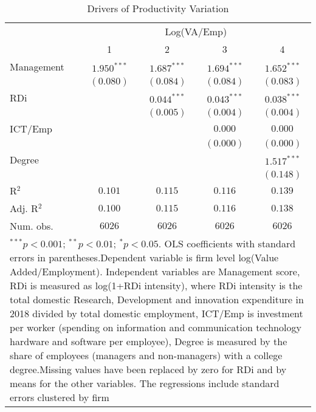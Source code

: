 \documentclass{article}
\begin{document}
\begin{table}
\caption{Drivers of Productivity Variation}
\begin{center}
\begin{normalsize}
\begin{tabular}{l c c c c}
\hline
 & \multicolumn{4}{c}{Log(VA/Emp)} \\
\cline{2-5}
 & 1 & 2 & 3 & 4 \\
\hline
Management & $1.950^{***}$ & $1.687^{***}$ & $1.694^{***}$ & $1.652^{***}$ \\
           & $(0.080)$     & $(0.084)$     & $(0.084)$     & $(0.083)$     \\
RDi        &               & $0.044^{***}$ & $0.043^{***}$ & $0.038^{***}$ \\
           &               & $(0.005)$     & $(0.004)$     & $(0.004)$     \\
ICT/Emp    &               &               & $0.000$       & $0.000$       \\
           &               &               & $(0.000)$     & $(0.000)$     \\
Degree     &               &               &               & $1.517^{***}$ \\
           &               &               &               & $(0.148)$     \\
\hline
R$^2$      & $0.101$       & $0.115$       & $0.116$       & $0.139$       \\
Adj. R$^2$ & $0.100$       & $0.115$       & $0.116$       & $0.138$       \\
Num. obs.  & $6026$        & $6026$        & $6026$        & $6026$        \\
\hline
\multicolumn{5}{l}{\scriptsize{\parbox{1\linewidth}{\vspace{3pt}$^{***}p<0.001$; $^{**}p<0.01$; $^{*}p<0.05$. \\OLS coefficients with standard errors in parentheses.Dependent variable is firm level log(Value Added/Employment). Independent variables are Management score, RDi is measured as log(1+RDi intensity), where RDi intensity is the total domestic Research, Development and innovation expenditure in 2018 divided by total domestic employment, ICT/Emp is investment per worker (spending on information and communication technology hardware and software per employee), Degree is measured by the share of employees (managers and non-managers) with a college degree.Missing values have been replaced by zero for RDi and by means for the other variables. The regressions include standard errors clustered by firm}}}
\end{tabular}
\end{normalsize}
\label{table:coefficients}
\end{center}
\end{table}
\end{document}
